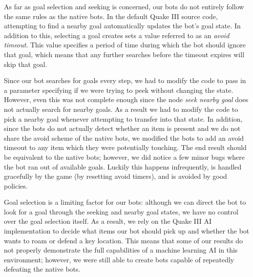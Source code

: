 As far as goal selection and seeking is concerned, our bots do not entirely follow the same rules as the native bots. In the default Quake III source code, attempting to find a nearby goal automatically updates the bot's goal state. In addition to this, selecting a goal creates sets a value referred to as an \emph{avoid timeout}. This value specifies a period of time during which the bot should ignore that goal, which means that any further searches before the timeout expires will skip that goal. 

Since our bot searches for goals every step, we had to modify the code to pass in a parameter specifying if we were trying to peek without changing the state. However, even this was not complete enough since the node \emph{seek nearby goal} does not actually search for nearby goals. As a result we had to modify the code to pick a nearby goal whenever attempting to transfer into that state. In addition, since the bots do not actually detect whether an item is present and we do not share the avoid scheme of the native bots, we modified the bots to add an avoid timeout to any item which they were potentially touching. The end result should be equivalent to the native bots; however, we did notice a few minor bugs where the bot ran out of available goals. Luckily this happens infrequently, is handled gracefully by the game (by resetting avoid timers), and is avoided by good policies.

Goal selection is a limiting factor for our bots: although we can direct the bot to look for a goal through the seeking and nearby goal states, we have no control over the goal selection itself. As a result, we rely on the Quake III AI implementation to decide what items our bot should pick up and whether the bot wants to roam or defend a key location. This means that some of our results do not properly demonstrate the full capabilities of a machine learning AI in this environment; however, we were still able to create bots capable of repeatedly defeating the native bots.